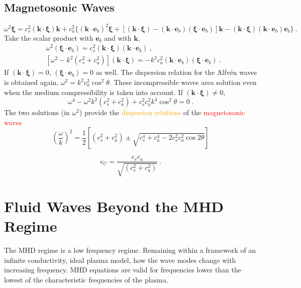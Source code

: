 \documentclass[12pt,a4paper]{article}
\renewcommand{\vec}[1]{\boldsymbol{#1}}
\begin{document}
\subsection{Magnetosonic Waves}
\begin{equation}
\omega^2 \vec{\xi} = c_s^2 (\vec{k} \cdot \vec{\xi})\vec{k} + c_a^2\{(\vec{k} \cdot \vec{e}_b)^2 \vec{\xi} +[(\vec{k} \cdot \vec{\xi}) -(\vec{k} \cdot \vec{e}_b)(\vec{\xi} \cdot \vec{e}_b)]\vec{k} - (\vec{k} \cdot \vec{\xi})(\vec{k} \cdot \vec{e}_b)\vec{e}_b \} ~.
\end{equation}
Take the scalar product with $\vec{e}_b$ and with $\vec{k}$, 
\begin{align*}
& \omega^2 (\vec{\xi} \cdot \vec{e}_b) = c_s^2 (\vec{k} \cdot \vec{\xi}) (\vec{k} \cdot \vec{e}_b) ~, \\
& [\omega^2 -k^2 (c_s^2 +c_a^2)] (\vec{k} \cdot \vec{\xi}) = -k^2 c_a^2 (\vec{k} \cdot \vec{e}_b)(\vec{\xi} \cdot \vec{e}_b) ~.
\end{align*}
If $(\vec{k} \cdot \vec{\xi}) = 0$, $(\vec{\xi} \cdot \vec{e}_b) = 0$ as well. The dispersion relation for the Alfv\'en waves is obtained again, $\omega^2 = k^2 c_a^2 \cos^2 \theta$. These incompressible waves area solution even when the medium compressibility is taken into account. If $(\vec{k} \cdot \vec{\xi}) \neq 0$, 
\begin{equation}
\omega^4 -\omega^2 k^2 (c_s^2 +c_a^2) +c_s^2 c_a^2 k^4 \cos^2 \theta = 0 ~.
\end{equation}
The two solutions (in $\omega^2$) provide the \textcolor{orange}{dispersion relations} of the \textcolor{red}{magnetosonic waves}
\begin{equation}
\left(\frac{\omega}{k} \right)^2 = \frac{1}{2} \left[(c_s^2 +c_a^2) \pm \sqrt{c_s^4 +c_a^4 -2c_s^2 c_a^2 \cos 2 \theta} \right]
\end{equation}


\begin{equation*}
v_C = \frac{c_s c_a}{\sqrt{(c_s^2 +c_a^2)} } ~.
\end{equation*}


\section{Fluid Waves Beyond the MHD Regime}
The MHD regime is a low frequency regime. Remaining within a framework of an infinite conductivity, ideal plasma model, how the wave modes change with increasing frequency. MHD equations are valid for frequencies lower than the lowest of the characteristic frequencies of the plasma. 
 
\end{document}

